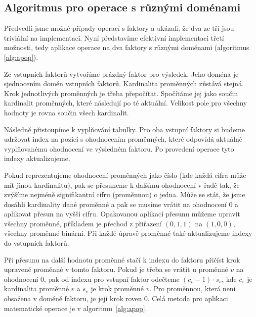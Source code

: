 \subsection{Algoritmus pro operace s různými doménami}

Předvedli jsme možné případy operací s faktory a ukázali, že dva ze tří jsou triviální na implementaci.
Nyní představíme efektivní implementaci třetí možnosti, tedy aplikace operace na dva faktory s různými doménami (algoritmus \ref{alg:apop}).

Ze vstupních faktorů vytvoříme prázdný faktor pro výsledek.
Jeho doména je sjednocením domén vstupních faktorů.
Kardinalita proměnných zůstává stejná.
Krok jednotlivých proměnných je třeba přepočítat.
Spočítáme jej jako součin kardinalit proměnných, které následují po té aktuální.
Velikost pole pro všechny hodnoty je rovna součin všech kardinalit.

Následně přistoupíme k vyplňování tabulky.
Pro oba vstupní faktory si budeme udržovat index na pozici s ohodnocením proměnných, které odpovídá aktuálně vyplňovanému ohodnocení ve výsledném faktoru.
Po provedení operace tyto indexy aktualizujeme.

Pokud reprezentujeme ohodnocení proměnných jako číslo (kde každá cifra může mít jinou kardinalitu), pak se přesuneme k dalšímu ohodnocení v řadě tak, že zvýšíme nejméně signifikantní cifru (proměnnou) o jedna.
Může se stát, že jsme dosáhli kardinality dané proměnné a pak se musíme vrátit na ohodnocení 0 a aplikovat přesun na vyšší cifru.
Opakovanou aplikací přesunu můžeme upravit všechny proměnné, příkladem je přechod z přiřazení $(0, 1, 1)$ na $(1, 0, 0)$, všechny proměnné binární.
Při každé úpravě proměnné také aktualizujeme indexy do vstupních faktorů.

Při přesunu na další hodnotu proměnné stačí k indexu do faktoru přičíst krok upravené proměnné v tomto faktoru.
Pokud je třeba se vrátit u proměnné $v$ na ohodnocení 0, pak od indexu pro vstupní faktor odečteme $(c_v - 1) \cdot s_v$, kde $c_v$ je kardinalita proměnné $v$ a $s_v$ je krok proměnné $v$.
Pro proměnnou, která není obsažena v doméně faktoru, je její krok roven 0.
Celá metoda pro aplikaci matematické operace je v algoritmu~\ref{alg:apop}.


